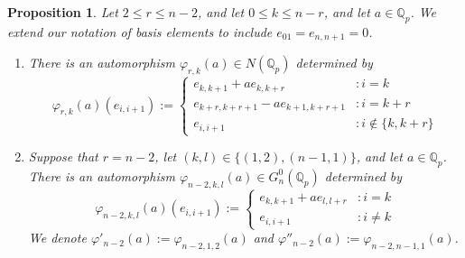 \documentclass{article}
\newtheorem{proposition2}[theorem2]{Proposition}
\begin{document}
\begin{proposition2}
\label{phi.r.k}
Let $2\leq{r}\leq{n-2}$, and let $0\leq{k}\leq{n-r}$, and let $a\in\mathbb{Q}_{p}$. We extend our notation of basis elements to include $e_{01}=e_{n,n+1}=0$.
\begin{enumerate}
\item There is an automorphism $\varphi_{r,k}(a)\in{N(\mathbb{Q}_{p})}$ determined by \[
    \varphi_{r,k}(a)(e_{i,i+1}):=\begin{cases}
        e_{k,k+1}+a{e_{k,k+r}} & : i=k\\
        e_{k+r,k+r+1}-a{e_{k+1,k+r+1}} & : i=k+r\\
        e_{i,i+1} & : i\notin\{k,k+r\}
    \end{cases}
\]
\item Suppose that $r=n-2$, let $(k,l)\in\{(1,2),(n-1,1)\}$, and let $a\in\mathbb{Q}_{p}$. There is an automorphism $\varphi_{n-2,k,l}(a)\in{G_{n}^{0}(\mathbb{Q}_{p})}$ determined by \[
    \varphi_{n-2,k,l}(a)(e_{i,i+1}):=\begin{cases}
        e_{k,k+1}+a{e_{l,l+r}} & : i=k\\
        e_{i,i+1} & : i\neq{k}
    \end{cases}
\]
    We denote $\varphi'_{n-2}(a):=\varphi_{n-2,1,2}(a)$ and $\varphi''_{n-2}(a):=\varphi_{n-2,n-1,1}(a)$.
\end{enumerate}
\end{proposition2}
\end{document}
